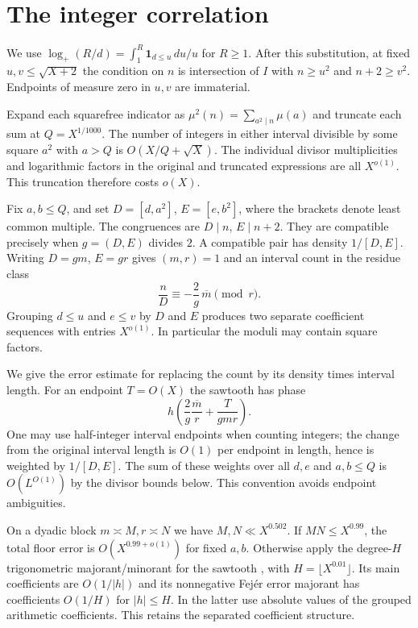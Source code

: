 \documentclass[11pt]{article}
\begin{document}
\section{The integer correlation}
We use $\log_+(R/d)=\int_1^R\mathbf1_{d\le u}\,du/u$ for $R\ge1$.
After this substitution, at fixed $u,v\le\sqrt{X+2}$ the
condition on $n$ is intersection of $I$ with $n\ge u^2$ and
$n+2\ge v^2$. Endpoints of measure zero in $u,v$ are immaterial.

Expand each squarefree indicator as
$\mu^2(n)=\sum_{a^2\mid n}\mu(a)$ and truncate each sum at
$Q=X^{1/1000}$. The number of integers in either interval divisible
by some square $a^2$ with $a>Q$ is $O(X/Q+\sqrt X)$. The individual
divisor multiplicities and logarithmic factors in the original and
truncated expressions are all $X^{o(1)}$. This truncation therefore
costs $o(X)$.

Fix $a,b\le Q$, and set $D=[d,a^2]$, $E=[e,b^2]$, where the
brackets denote least common multiple. The congruences are
$D\mid n$, $E\mid n+2$. They are compatible precisely when
$g=(D,E)$ divides $2$. A compatible pair has density $1/[D,E]$.
Writing $D=gm$, $E=gr$ gives $(m,r)=1$ and an interval count
in the residue class
\[
 \frac{n}{D}\equiv-\frac{2}{g}\,\overline m\pmod r .
\]
Grouping $d\le u$ and $e\le v$ by $D$ and $E$ produces two
separate coefficient sequences with entries $X^{o(1)}$.
In particular the moduli may contain square factors.

We give the error estimate for replacing the count by its density
times interval length. For an endpoint $T=O(X)$ the sawtooth
has phase
\[
 h\left(\frac{2}{g}\frac{\overline m}{r}
                +\frac{T}{gmr}\right).
\]
One may use half-integer interval endpoints when counting integers;
the change from the original interval length is $O(1)$ per endpoint
in length, hence is weighted by $1/[D,E]$. The sum of these weights
over all $d,e$ and $a,b\le Q$ is $O(L^{O(1)})$ by the divisor
bounds below. This convention avoids endpoint ambiguities.

On a dyadic block $m\asymp M,r\asymp N$ we have $M,N\ll X^{0.502}$.
If $MN\le X^{0.99}$, the total floor error is
$O(X^{0.99+o(1)})$ for fixed $a,b$. Otherwise apply the
degree-$H$ trigonometric majorant/minorant for the sawtooth
\cite{Vaaler}, with $H=\lfloor X^{0.01}\rfloor$. Its main
coefficients are $O(1/|h|)$ and its nonnegative Fej\'er error
majorant has coefficients $O(1/H)$ for $|h|\le H$.
In the latter use absolute values of the grouped arithmetic
coefficients. This retains the separated coefficient structure.
\end{document}
